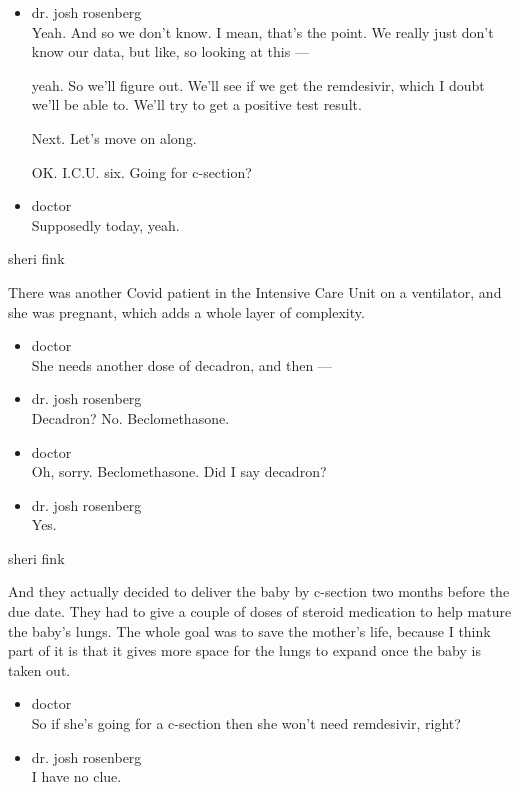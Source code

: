 \begin{itemize}
\item
  dr. josh rosenberg\\
  Yeah. And so we don't know. I mean, that's the point. We really just
  don't know our data, but like, so looking at this ---

  yeah. So we'll figure out. We'll see if we get the remdesivir, which I
  doubt we'll be able to. We'll try to get a positive test result.

  Next. Let's move on along.

  OK. I.C.U. six. Going for c-section?
\item
  doctor\\
  Supposedly today, yeah.
\end{itemize}

sheri fink

There was another Covid patient in the Intensive Care Unit on a
ventilator, and she was pregnant, which adds a whole layer of
complexity.

\begin{itemize}
\item
  doctor\\
  She needs another dose of decadron, and then ---
\item
  dr. josh rosenberg\\
  Decadron? No. Beclomethasone.
\item
  doctor\\
  Oh, sorry. Beclomethasone. Did I say decadron?
\item
  dr. josh rosenberg\\
  Yes.
\end{itemize}

sheri fink

And they actually decided to deliver the baby by c-section two months
before the due date. They had to give a couple of doses of steroid
medication to help mature the baby's lungs. The whole goal was to save
the mother's life, because I think part of it is that it gives more
space for the lungs to expand once the baby is taken out.

\begin{itemize}
\item
  doctor\\
  So if she's going for a c-section then she won't need remdesivir,
  right?
\item
  dr. josh rosenberg\\
  I have no clue.
\end{itemize}

